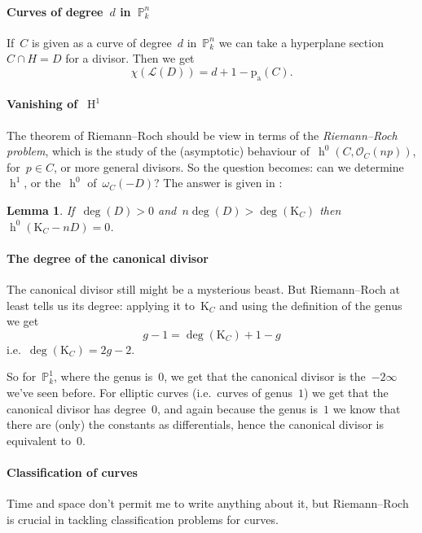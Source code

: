 \documentclass[10pt,a4paper]{article}
\theoremstyle{lecture}
\newtheorem{lemma}[theorem]{Lemma}
\DeclareMathOperator\hh{h}
\DeclareMathOperator\HH{H}
\begin{document}
\paragraph{Curves of degree~$d$ in~$\mathbb{P}_k^n$}
If~$C$ is given as a curve of degree~$d$ in~$\mathbb{P}_k^n$ we can take a hyperplane section~$C\cap H=D$ for a divisor. Then we get
\begin{equation}
  \chi(\mathcal{L}(D))=d+1-\mathrm{p}_{\mathrm{a}}(C).
\end{equation}

\paragraph{Vanishing of~$\HH^1$}
The theorem of Riemann--Roch should be view in terms of the \emph{Riemann--Roch problem}, which is the study of the (asymptotic) behaviour of~$\hh^0(C,\mathcal{O}_C(np))$, for~$p\in C$, or more general divisors. So the question becomes: can we determine~$\hh^1$, or the~$\hh^0$ of~$\omega_C(-D)$? The answer is given in \cite[remark IV.1.3.2]{hartshorne-algebraic-geometry}:
\begin{lemma}
  If~$\deg(D)>0$ and~$n\deg(D)>\deg(\mathrm{K}_C)$ then~$\hh^0(\mathrm{K}_C-nD)=0$.
\end{lemma}

\paragraph{The degree of the canonical divisor}
The canonical divisor still might be a mysterious beast. But Riemann--Roch at least tells us its degree: applying it to~$\mathrm{K}_C$ and using the definition of the genus we get
\begin{equation}
  g-1=\deg(\mathrm{K}_C)+1-g
\end{equation}
i.e.\ $\deg(\mathrm{K}_C)=2g-2$.

So for~$\mathbb{P}_k^1$, where the genus is~$0$, we get that the canonical divisor is the~$-2\infty$ we've seen before. For elliptic curves (i.e.\ curves of genus~$1$) we get that the canonical divisor has degree~$0$, and again because the genus is~$1$ we know that there are (only) the constants as differentials, hence the canonical divisor is equivalent to~$0$.

\paragraph{Classification of curves}
Time and space don't permit me to write anything about it, but Riemann--Roch is crucial in tackling classification problems for curves.
\end{document}
